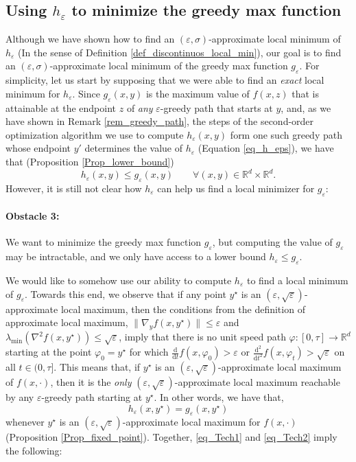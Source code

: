 \documentclass[11pt,letterpaper]{article}
\renewcommand{\epsilon}{\varepsilon}
\begin{document}
\subsection{Using $h_\epsilon$ to minimize the greedy max function} \label{sec_exact_local_min}
%
%
Although we have shown how to find an $(\epsilon, \sigma)$-approximate local minimum of $h_\epsilon$ (In the sense of Definition \ref{def_discontinuos_local_min}), our goal is to find an $(\epsilon, \sigma)$-approximate local minimum of the greedy max function $g_\epsilon$.   
%
For simplicity, let us start by supposing that we were able to find an {\em exact} local minimum for $h_\epsilon$. %
%
Since $g_\epsilon(x, y)$ is the maximum value of $f(x, z)$ that is attainable at the endpoint $z$ of {\em any} $\epsilon$-greedy path that starts at $y$, and, as we have shown in Remark \ref{rem_greedy_path}, the steps of the second-order optimization algorithm we use to compute $h_\epsilon(x,y)$ form one such greedy path whose endpoint $y'$ determines the value of $h_{\epsilon}$ (Equation \eqref{eq_h_eps}), we have that (Proposition \ref{Prop_lower_bound})
%
\begin{equation} \label{eq_Tech1}
h_{\epsilon} (x,y) \leq g_{\epsilon}(x,y) \qquad \forall (x,y) \in \mathbb{R}^d \times \mathbb{R}^d.
\end{equation}
%
However, it is still not clear how $h_{\epsilon}$ can help us find a local minimizer for $g_{\epsilon}$:

\paragraph{Obstacle 3:}
%
%
We want to minimize the greedy max function $g_\epsilon$, but computing the value of $g_\epsilon$ may be intractable, and we only have access to a lower bound $h_\epsilon \leq g_\epsilon$.
%
%


%
 We would like to somehow use our ability to compute $h_\epsilon$ to find a local minimum of $g_\epsilon$.
%
Towards this end, we observe that if any point $y^\star$ is an $(\epsilon, \sqrt{\epsilon})$-approximate local maximum, then 
%
 the conditions from the definition of approximate local maximum, $\|\nabla_y f(x,y^\star)\| \leq \epsilon$ and $\lambda_{\mathrm{min}}( \nabla^2 f(x, y^\star)) \leq \sqrt{\epsilon}$, imply that there is no unit speed path $\varphi: [0,\tau] \rightarrow \mathbb{R}^d$ starting at the point $\varphi_0 = y^\star$ for which $\frac{\mathrm{d}}{\mathrm{d}t} f(x, \varphi_0) >\epsilon$ or $\frac{\mathrm{d}^2}{\mathrm{d}t^2} f(x, \varphi_t) > \sqrt{\epsilon}$ on all $t \in (0, \tau]$.
%
This means that, if $y^\star$ is an $(\epsilon, \sqrt{\epsilon})$-approximate local maximum of $f(x, \cdot)$, then it is the {\em only} $(\epsilon, \sqrt{\epsilon})$-approximate local maximum reachable by any $\epsilon$-greedy path starting at $y^\star$.
%
In other words, we have that,
\begin{equation} \label{eq_Tech2}
h_\epsilon(x, y^\star) = g_\epsilon(x,y^\star)
\end{equation}
whenever $y^\star$ is an $(\epsilon, \sqrt{\epsilon})$-approximate local maximum for $f(x,\cdot)$ (Proposition \ref{Prop_fixed_point}).
%
Together, \eqref{eq_Tech1} and \eqref{eq_Tech2} imply the following:
%
\end{document}
